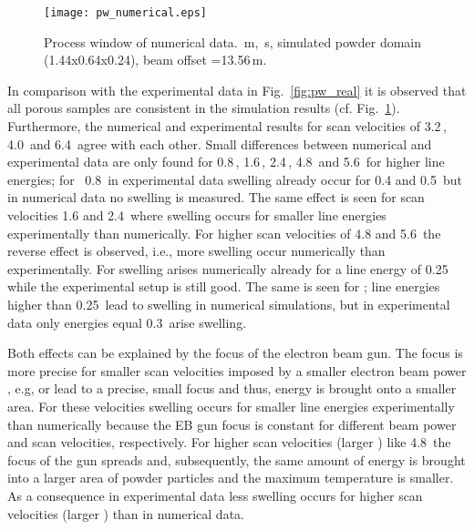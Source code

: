 \begin{figure}[htpb!]
\centering
 \texttt{[image: pw\_numerical.eps]}
\caption{Process window of numerical data. \,m, \,s, simulated powder domain (1.44x0.64x0.24), beam offset =13.56\,m.}
\label{fig:pw_num}
\end{figure}
In comparison with the experimental data in Fig.~\ref{fig:pw_real} it is observed that all porous samples 
are consistent in the simulation results (cf. Fig.~\ref{fig:pw_num}). Furthermore, the numerical and experimental results for scan velocities 
of 3.2\,, 4.0\, and 6.4\, agree with each other.
Small differences between numerical and experimental data are only found for 0.8\,, 1.6\,, 2.4\,, 
4.8\, and 5.6\, for higher line energies; for ~0.8\, in experimental data swelling
already occur for 0.4 and 0.5\, but in numerical data no swelling is measured. The same effect is seen for scan velocities 1.6 and 2.4\, 
where swelling occurs for smaller line energies experimentally than numerically. For higher scan velocities of 4.8 and 5.6\, 
the reverse effect is observed, i.e., more swelling occur numerically than experimentally. For  swelling arises numerically already for a line 
energy of 0.25\, while the experimental setup is still good. The same is seen for ; line energies higher than
0.25\, lead to swelling in numerical simulations, but in experimental data only energies equal 0.3\, arise swelling. 

Both effects can be explained by the focus of the electron beam gun. The focus is more precise for smaller scan velocities imposed by a smaller electron beam power , e.g, 
 or  lead to a precise, small focus and thus, energy is brought onto a smaller area. 
For these velocities swelling occurs for smaller line energies experimentally than numerically because the EB gun focus is constant for different beam power and scan velocities, respectively. 
For higher scan velocities (larger ) 
like 4.8\, the focus of the gun spreads and, subsequently, the same amount of energy is brought into a larger area of powder particles and the maximum 
temperature is smaller. As a consequence in experimental data less swelling occurs for higher scan velocities (larger ) than in numerical data. 


